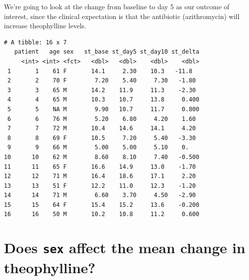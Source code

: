 \documentclass[]{book}
\newenvironment{Shaded}{\begin{snugshade}}{\end{snugshade}}
\newcommand{\KeywordTok}[1]{\textcolor[rgb]{0.13,0.29,0.53}{\textbf{#1}}}
\newcommand{\DataTypeTok}[1]{\textcolor[rgb]{0.13,0.29,0.53}{#1}}
\newcommand{\StringTok}[1]{\textcolor[rgb]{0.31,0.60,0.02}{#1}}
\newcommand{\OperatorTok}[1]{\textcolor[rgb]{0.81,0.36,0.00}{\textbf{#1}}}
\newcommand{\NormalTok}[1]{#1}
\theoremstyle{definition}
\theoremstyle{definition}
\theoremstyle{definition}
\theoremstyle{remark}
\begin{document}
We're going to look at the change from baseline to day 5 as our outcome
of interest, since the clinical expectation is that the antibiotic
(azithromycin) will increase theophylline levels.

\begin{Shaded}
\end{Shaded}

\begin{verbatim}
# A tibble: 16 x 7
   patient   age sex   st_base st_day5 st_day10 st_delta
     <int> <int> <fct>   <dbl>   <dbl>    <dbl>    <dbl>
 1       1    61 F       14.1     2.30    10.3   -11.8  
 2       2    70 F        7.20    5.40     7.30   -1.80 
 3       3    65 M       14.2    11.9     11.3    -2.30 
 4       4    65 M       10.3    10.7     13.8     0.400
 5       5    NA M        9.90   10.7     11.7     0.800
 6       6    76 M        5.20    6.80     4.20    1.60 
 7       7    72 M       10.4    14.6     14.1     4.20 
 8       8    69 F       10.5     7.20     5.40   -3.30 
 9       9    66 M        5.00    5.00     5.10    0.   
10      10    62 M        8.60    8.10     7.40   -0.500
11      11    65 F       16.6    14.9     13.0    -1.70 
12      12    71 M       16.4    18.6     17.1     2.20 
13      13    51 F       12.2    11.0     12.3    -1.20 
14      14    71 M        6.60    3.70     4.50   -2.90 
15      15    64 F       15.4    15.2     13.6    -0.200
16      16    50 M       10.2    10.8     11.2     0.600
\end{verbatim}

\section{\texorpdfstring{Does \texttt{sex} affect the mean change in
theophylline?}{Does sex affect the mean change in theophylline?}}\label{does-sex-affect-the-mean-change-in-theophylline}

\begin{Shaded}
\end{Shaded}
\end{document}

